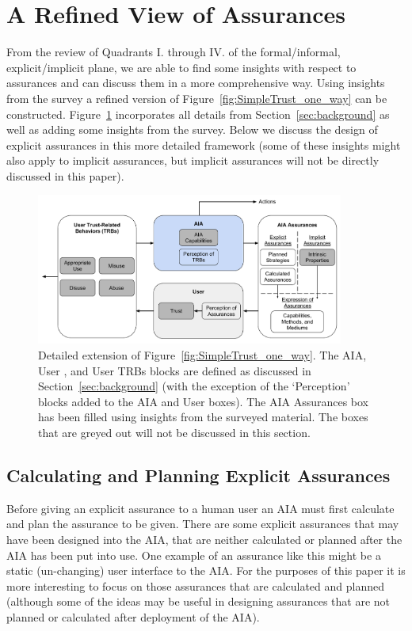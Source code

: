 \section{A Refined View of Assurances} \label{sec:synthesis}
    From the review of Quadrants I. through IV. of the formal/informal, explicit/implicit plane, we are able to find some insights with respect to assurances and can discuss them in a more comprehensive way. Using insights from the survey a refined version of Figure~\ref{fig:SimpleTrust_one_way} can be constructed. Figure~\ref{fig:refined_assurances} incorporates all details from Section~\ref{sec:background} as well as adding some insights from the survey. Below we discuss the design of explicit assurances in this more detailed framework (some of these insights might also apply to implicit assurances, but implicit assurances will not be directly discussed in this paper).

    \begin{figure}[htbp]
        \centering
        \includegraphics[width=0.9\textwidth]{Figures/RefinedTrust_one_way}
        \caption{Detailed extension of Figure~\ref{fig:SimpleTrust_one_way}. The AIA, User , and User TRBs blocks are defined as discussed in Section~\ref{sec:background} (with the exception of the `Perception' blocks added to the AIA and User boxes). The AIA Assurances box has been filled using insights from the surveyed material. The boxes that are greyed out will not be discussed in this section.}
        \label{fig:refined_assurances}
    \end{figure}

\subsection{Calculating and Planning Explicit Assurances}
    Before giving an explicit assurance to a human user an AIA must first calculate and plan the assurance to be given. There are some explicit assurances that may have been designed into the AIA, that are neither calculated or planned after the AIA has been put into use. One example of an assurance like this might be a static (un-changing) user interface to the AIA. For the purposes of this paper it is more interesting to focus on those assurances that are calculated and planned (although some of the ideas may be useful in designing assurances that are not planned or calculated after deployment of the AIA).

